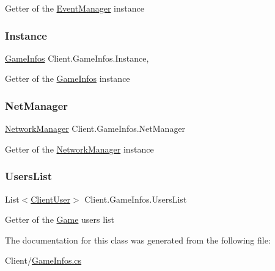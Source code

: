 Getter of the \hyperlink{class_client_1_1_event_manager}{Event\+Manager} instance \mbox{\label{class_client_1_1_game_infos_a09359e8cbd7142ba3b493250a06132a6}} 
\subsubsection{\texorpdfstring{Instance}{Instance}}
{\footnotesize\ttfamily \hyperlink{class_client_1_1_game_infos}{Game\+Infos} Client.\+Game\+Infos.\+Instance\hspace{0.3cm}{\ttfamily [static]}, {\ttfamily [get]}}

Getter of the \hyperlink{class_client_1_1_game_infos}{Game\+Infos} instance \mbox{\label{class_client_1_1_game_infos_a43ff6022f351a13ccdf8bf7c4abdf922}} 
\subsubsection{\texorpdfstring{Net\+Manager}{NetManager}}
{\footnotesize\ttfamily \hyperlink{class_client_1_1_network_manager}{Network\+Manager} Client.\+Game\+Infos.\+Net\+Manager\hspace{0.3cm}{\ttfamily [get]}}

Getter of the \hyperlink{class_client_1_1_network_manager}{Network\+Manager} instance \mbox{\label{class_client_1_1_game_infos_a0fa9e2a98ced445c3c1ba6068cdcb995}} 
\subsubsection{\texorpdfstring{Users\+List}{UsersList}}
{\footnotesize\ttfamily List$<$\hyperlink{class_client_1_1_client_user}{Client\+User}$>$ Client.\+Game\+Infos.\+Users\+List\hspace{0.3cm}{\ttfamily [get]}}

Getter of the \hyperlink{namespace_game}{Game} users list 

The documentation for this class was generated from the following file\+:\begin{DoxyCompactItemize}
\item 
Client/\hyperlink{_game_infos_8cs}{Game\+Infos.\+cs}\end{DoxyCompactItemize}
